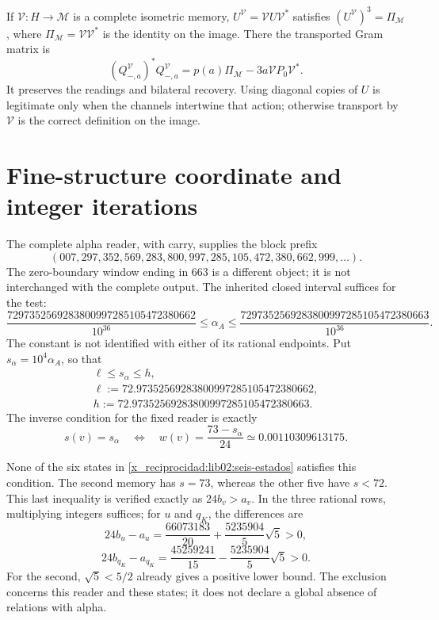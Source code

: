 If \(\mathcal V:H\to\mathcal M\) is a complete isometric memory, \(U^{\mathcal V}=\mathcal VU\mathcal V^*\) satisfies \((U^{\mathcal V})^3=\Pi_{\mathcal M}\), where \(\Pi_{\mathcal M}=\mathcal V\mathcal V^*\) is the identity on the image. There the transported Gram matrix is
\[
 (Q_{-,a}^{\mathcal V})^*Q_{-,a}^{\mathcal V}
 =p(a)\Pi_{\mathcal M}-3a\mathcal VP_0\mathcal V^*.
\]
It preserves the readings and bilateral recovery. Using diagonal copies of \(U\) is legitimate only when the channels intertwine that action; otherwise transport by \(\mathcal V\) is the correct definition on the image.

\section{Fine-structure coordinate and integer iterations}
\label{x_reciprocidad:lib02:ensayo-inverso}

The complete alpha reader, with carry, supplies the block prefix
\[
 (007,297,352,569,283,800,997,285,105,472,380,662,999,\ldots).
\]
The zero-boundary window ending in 663 is a different object; it is not interchanged with the complete output. The inherited closed interval suffices for the test:
\begin{equation}
 \frac{7297352569283800997285105472380662}{10^{36}}
 \leq\alpha_A\leq
 \frac{7297352569283800997285105472380663}{10^{36}}.
 \label{x_reciprocidad:lib02:intervalo-alpha}
\end{equation}
The constant is not identified with either of its rational endpoints. Put \(s_\alpha=10^4\alpha_A\), so that
\begin{equation}
 \begin{gathered}
 \ell\leq s_\alpha\leq h,\\
 \ell:=72.97352569283800997285105472380662,\\
 h:=72.97352569283800997285105472380663.
 \end{gathered}
 \label{x_reciprocidad:lib02:intervalo-s}
\end{equation}
The inverse condition for the fixed reader is exactly
\begin{equation}
 s(v)=s_\alpha
 \quad\Longleftrightarrow\quad
 w(v)=\frac{73-s_\alpha}{24}
 \simeq0.00110309613175.
 \label{x_reciprocidad:lib02:criterio-alpha}
\end{equation}

None of the six states in \cref{x_reciprocidad:lib02:seis-estados} satisfies this condition. The second memory has \(s=73\), whereas the other five have \(s<72\). This last inequality is verified exactly as \(24b_v>a_v\). In the three rational rows, multiplying integers suffices; for \(u\) and \(q_K\), the differences are
\[
 24b_u-a_u=\frac{66073183}{20}+\frac{5235904}{5}\sqrt5>0,
\]
\[
 24b_{q_K}-a_{q_K}
 =\frac{45259241}{15}-\frac{5235904}{5}\sqrt5>0.
\]
For the second, \(\sqrt5<5/2\) already gives a positive lower bound. The exclusion concerns this reader and these states; it does not declare a global absence of relations with alpha.

